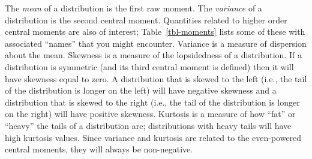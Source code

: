 \documentclass[
  a4paper,
  DIV=11,
  numbers=noendperiod,
  oneside]{scrreprt}
\theoremstyle{plain}
\theoremstyle{definition}
\theoremstyle{definition}
\theoremstyle{definition}
\theoremstyle{plain}
\theoremstyle{remark}
\begin{document}
The \emph{mean} of a distribution is the first raw moment. The
\emph{variance} of a distribution is the second central moment.
Quantities related to higher order central moments are also of interest;
Table~\ref{tbl-moments} lists some of these with associated ``names''
that you might encounter. Variance is a measure of dispersion about the
mean. Skewness is a measure of the lopsidedness of a distribution. If a
distribution is symmetric (and its third central moment is defined) then
it will have skewness equal to zero. A distribution that is skewed to
the left (i.e., the tail of the distribution is longer on the left) will
have negative skewness and a distribution that is skewed to the right
(i.e., the tail of the distribution is longer on the right) will have
positive skewness. Kurtosis is a measure of how ``fat'' or ``heavy'' the
tails of a distribution are; distributions with heavy tails will have
high kurtosis values. Since variance and kurtosis are related to the
even-powered central moments, they will always be non-negative.

\begin{table}

\caption{\label{tbl-moments}First few moments for a rv \(X\) with mean
\(\mu = \mathbf{E}[X]\).}

\begin{minipage}{0.50\linewidth}



\end{minipage}%
%
\begin{minipage}{0.50\linewidth}



\end{minipage}%

\end{table}%
\end{document}
